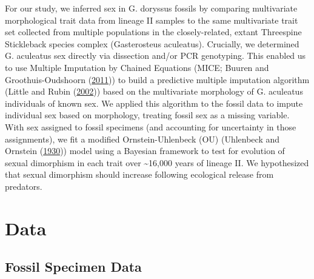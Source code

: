 \documentclass[
  12pt,
]{article}
\begin{document}
For our study, we inferred sex in G. doryssus fossils by comparing
multivariate morphological trait data from lineage II samples to the
same multivariate trait set collected from multiple populations in the
closely-related, extant Threespine Stickleback species complex
(Gasterosteus aculeatus). Crucially, we determined G. aculeatus sex
directly via dissection and/or PCR genotyping. This enabled us to use
Multiple Imputation by Chained Equations (MICE; Buuren and
Groothuis-Oudshoorn (\protect\hyperlink{ref-MICE}{2011})) to build a
predictive multiple imputation algorithm (Little and Rubin
(\protect\hyperlink{ref-little2002statistical}{2002})) based on the
multivariate morphology of G. aculeatus individuals of known sex. We
applied this algorithm to the fossil data to impute individual sex based
on morphology, treating fossil sex as a missing variable. With sex
assigned to fossil specimens (and accounting for uncertainty in those
assignments), we fit a modified Ornstein-Uhlenbeck (OU) (Uhlenbeck and
Ornstein (\protect\hyperlink{ref-OUProcess}{1930})) model using a
Bayesian framework to test for evolution of sexual dimorphism in each
trait over \textasciitilde16,000 years of lineage II. We hypothesized
that sexual dimorphism should increase following ecological release from
predators.

\hypertarget{sec:data}{%
\section{Data}\label{sec:data}}

\hypertarget{fossil-specimen-data}{%
\subsection{Fossil Specimen Data}\label{fossil-specimen-data}}
\end{document}
